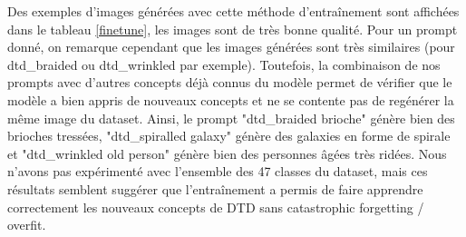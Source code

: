 \documentclass{article}
\begin{document}
Des exemples d'images générées avec cette méthode d'entraînement sont affichées dans le tableau \ref{finetune}, les images sont de très bonne qualité. Pour un prompt donné, on remarque cependant que les images générées sont très similaires (pour dtd\_braided ou dtd\_wrinkled par exemple). Toutefois, la combinaison de nos prompts avec d'autres concepts déjà connus du modèle permet de vérifier que le modèle a bien appris de nouveaux concepts et ne se contente pas de regénérer la même image du dataset. Ainsi, le prompt "dtd\_braided brioche" génère bien des brioches tressées, "dtd\_spiralled galaxy" génère des galaxies en forme de spirale et "dtd\_wrinkled old person" génère bien des personnes âgées très ridées. Nous n'avons pas expérimenté avec l'ensemble des 47 classes du dataset, mais ces résultats semblent suggérer que l'entraînement a permis de faire apprendre correctement les nouveaux concepts de DTD sans catastrophic forgetting / overfit.
\end{document}

